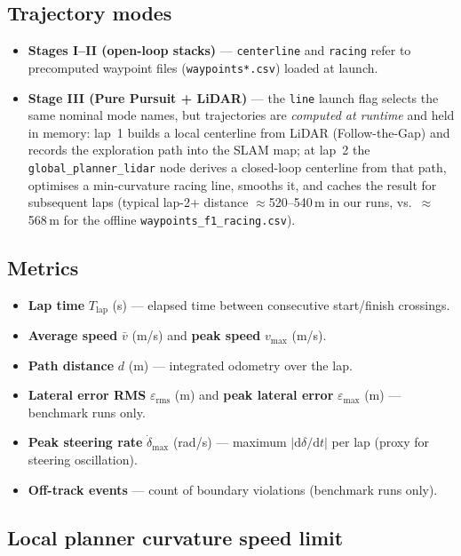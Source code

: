 \documentclass[11pt,a4paper]{article}
\begin{document}
\subsection{Trajectory modes}
\begin{itemize}[nosep]
  \item \textbf{Stages I--II (open-loop stacks)} --- \texttt{centerline} and
        \texttt{racing} refer to precomputed waypoint files
        (\texttt{waypoints*.csv}) loaded at launch.
  \item \textbf{Stage III (Pure Pursuit + LiDAR)} --- the \texttt{line} launch
        flag selects the same nominal mode names, but trajectories are
        \emph{computed at runtime} and held in memory:
        lap~1 builds a local centerline from LiDAR (Follow-the-Gap) and records
        the exploration path into the SLAM map; at lap~2 the
        \texttt{global\_planner\_lidar} node derives a closed-loop centerline
        from that path, optimises a min-curvature racing line, smooths it, and
        caches the result for subsequent laps (typical lap-2+ distance
        ${\approx}$520--540\,m in our runs, vs.\ ${\approx}$568\,m for the
        offline \texttt{waypoints\_f1\_racing.csv}).
\end{itemize}

\subsection{Metrics}
\begin{itemize}[nosep]
  \item \textbf{Lap time} $T_{\mathrm{lap}}$ (s) --- elapsed time between consecutive
        start/finish crossings.
  \item \textbf{Average speed} $\bar{v}$ (m/s) and \textbf{peak speed}
        $v_{\max}$ (m/s).
  \item \textbf{Path distance} $d$ (m) --- integrated odometry over the lap.
  \item \textbf{Lateral error RMS} $\varepsilon_{\mathrm{rms}}$ (m) and
        \textbf{peak lateral error} $\varepsilon_{\max}$ (m) --- benchmark runs only.
  \item \textbf{Peak steering rate} $\dot{\delta}_{\max}$ (rad/s) --- maximum
        $|\mathrm{d}\delta/\mathrm{d}t|$ per lap (proxy for steering oscillation).
  \item \textbf{Off-track events} --- count of boundary violations (benchmark runs only).
\end{itemize}

\subsection{Local planner curvature speed limit}
\label{sec:local-speed}
\end{document}
